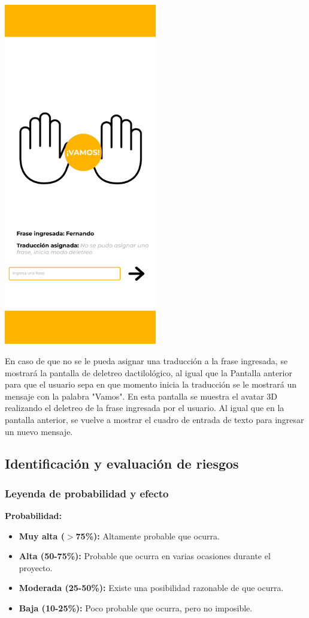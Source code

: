 \begin{center}
    \includegraphics[width=0.5\textwidth]{Images/Cap 3/Pantalla4.png}
\end{center}

En caso de que no se le pueda asignar una traducción a la frase ingresada, se mostrará la pantalla de deletreo dactilológico, al igual que la Pantalla anterior para que el usuario sepa en que momento inicia la traducción se le mostrará un mensaje con la palabra "Vamos". En esta pantalla se muestra el avatar 3D realizando el deletreo de la frase ingresada por el usuario. Al igual que en la pantalla anterior, se vuelve a mostrar el cuadro de entrada de texto para ingresar un nuevo mensaje.




\subsection{Identificación y evaluación de riesgos}
\subsubsection{Leyenda de probabilidad y efecto}
\textbf{Probabilidad:}
\begin{itemize}
	\item \textbf{Muy alta ($>$75\%):} Altamente probable que ocurra.
	\item \textbf{Alta (50-75\%):} Probable que ocurra en varias ocasiones durante el proyecto.
	\item \textbf{Moderada (25-50\%):} Existe una posibilidad razonable de que ocurra.
	\item \textbf{Baja (10-25\%):} Poco probable que ocurra, pero no imposible.
\end{itemize}

